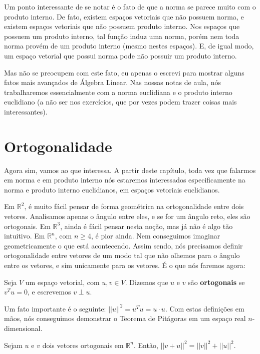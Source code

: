 Um ponto interessante de se notar é o fato de que a norma se parece muito com o produto interno. De fato, existem espaços vetoriais que não possuem norma, e existem espaços vetoriais que não possuem produto interno. Nos espaços que possuem um produto interno, tal função induz uma norma, porém nem toda norma provém de um produto interno (mesmo nestes espaços). E, de igual modo, um espaço vetorial que possui norma pode não possuir um produto interno.

Mas não se preocupem com este fato, eu apenas o escrevi para mostrar alguns fatos mais avançados de Álgebra Linear. Nas nossas notas de aula, nós trabalharemos essencialmente com a norma euclidiana e o produto interno euclidiano (a não ser nos exercícios, que por vezes podem trazer coisas mais interessantes).

\section{Ortogonalidade}

Agora sim, vamos ao que interessa. A partir deste capítulo, toda vez que falarmos em norma e em produto interno nós estaremos interessados especificamente na norma e produto interno euclidianos, em espaços vetoriais euclidianos.

Em $\mathbb{R}^2$, é muito fácil pensar de forma geométrica na ortogonalidade entre dois vetores. Analisamos apenas o ângulo entre eles, e se for um ângulo reto, eles são ortogonais. Em $\mathbb{R}^3$, ainda é fácil pensar nesta noção, mas já não é algo tão intuitivo. Em $\mathbb{R}^n$, com $n\geq 4$, é pior ainda. Nem conseguimos imaginar geometricamente o que está acontecendo. Assim sendo, nós precisamos definir ortogonalidade entre vetores de um modo tal que não olhemos para o ângulo entre os vetores, e sim unicamente para os vetores. É o que nós faremos agora:

\begin{Definition}
	Seja $V$ um espaço vetorial, com $u,v\in V$. Dizemos que $u$ e $v$ são \textbf{ortogonais} se $v^Tu = 0$, e escrevemos $v\perp u$.
\end{Definition}

Um fato importante é o seguinte: $||u||^2 = u^Tu = u\cdot u$. Com estas definições em mãos, nós conseguimos demonstrar o Teorema de Pitágoras em um espaço real $n$-dimensional.

\begin{Theorem}
	Sejam $u$ e $v$ dois vetores ortogonais em $\mathbb{R}^n$. Então, $||v + u||^2 = ||v||^2 + ||u||^2$.
\end{Theorem}

